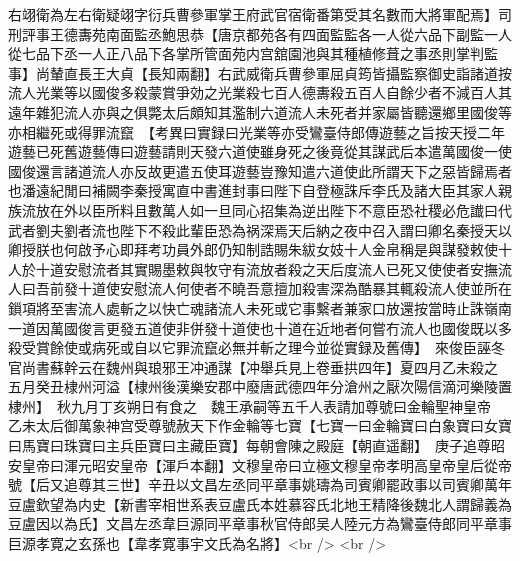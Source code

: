 右翊衛為左右衛疑翊字衍兵曹參軍掌王府武官宿衛番第受其名數而大將軍配焉】司刑評事王德夀苑南面監丞鮑思恭【唐京都苑各有四面監監各一人從六品下副監一人從七品下丞一人正八品下各掌所管面苑内宫舘園池與其種植修葺之事丞則掌判監事】尚輦直長王大貞【長知兩翻】右武威衛兵曹參軍屈貞筠皆攝監察御史詣諸道按流人光業等以國俊多殺蒙賞爭効之光業殺七百人德夀殺五百人自餘少者不減百人其遠年雜犯流人亦與之俱斃太后頗知其濫制六道流人未死者并家屬皆聽還鄉里國俊等亦相繼死或得罪流竄　【考異曰實録曰光業等亦受鸞臺侍郎傳遊藝之旨按天授二年遊藝已死舊遊藝傳曰遊藝請則天發六道使雖身死之後竟從其謀武后本遣萬國俊一使國俊還言諸道流人亦反故更遣五使耳遊藝豈豫知遣六道使此所謂天下之惡皆歸焉者也潘遠紀閒曰補闕李秦授寓直中書進封事曰陛下自登極誅斥李氏及諸大臣其家人親族流放在外以臣所料且數萬人如一旦同心招集為逆出陛下不意臣恐社稷必危䜟曰代武者劉夫劉者流也陛下不殺此輩臣恐為祸深焉天后納之夜中召入謂曰卿名秦授天以卿授朕也何啟予心即拜考功員外郎仍知制誥賜朱紱女妓十人金帛稱是與謀發敕使十人於十道安慰流者其實賜墨敕與牧守有流放者殺之天后度流人已死又使使者安撫流人曰吾前發十道使安慰流人何使者不曉吾意擅加殺害深為酷暴其輒殺流人使並所在鎻項將至害流人處斬之以快亡魂諸流人未死或它事繫者兼家口放還按當時止誅嶺南一道因萬國俊言更發五道使非併發十道使也十道在近地者何嘗冇流人也國俊既以多殺受賞餘使或病死或自以它罪流竄必無并斬之理今並從實録及舊傳】　來俊臣誣冬官尚書蘇幹云在魏州與琅邪王冲通謀【冲舉兵見上卷垂拱四年】夏四月乙未殺之　五月癸丑棣州河溢【棣州後漢樂安郡中廢唐武德四年分滄州之厭次陽信滴河樂陵置棣州】　秋九月丁亥朔日有食之　魏王承嗣等五千人表請加尊號曰金輪聖神皇帝　乙未太后御萬象神宫受尊號赦天下作金輪等七寶【七寶一曰金輪寶曰白象寶曰女寶曰馬寶曰珠寶曰主兵臣寶曰主藏臣寶】每朝會陳之殿庭【朝直遥翻】　庚子追尊昭安皇帝曰渾元昭安皇帝【渾戶本翻】文穆皇帝曰立極文穆皇帝孝明高皇帝皇后從帝號【后又追尊其三世】辛丑以文昌左丞同平章事姚璹為司賓卿罷政事以司賓卿萬年豆盧欽望為内史【新書宰相世系表豆盧氏本姓慕容氏北地王精降後魏北人謂歸義為豆盧因以為氏】文昌左丞韋巨源同平章事秋官侍郎吴人陸元方為鸞臺侍郎同平章事巨源孝寛之玄孫也【韋孝寛事宇文氏為名將】<br />
<br />
